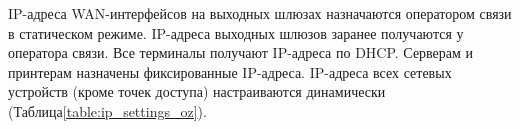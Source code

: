 %
%

IP-адреса WAN-интерфейсов на выходных шлюзах назначаются оператором связи в статическом режиме. IP-адреса выходных шлюзов заранее получаются у оператора связи. Все терминалы получают IP-адреса по DHCP. Серверам и принтерам назначены фиксированные IP-адреса. IP-адреса всех сетевых устройств (кроме точек доступа) настраиваются динамически (Таблица\;\ref{table:ip_settings_oz}). 

